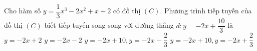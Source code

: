 \begin{ex}%
	Cho hàm số $y=\dfrac {1}{3} x^3-2x^2+x+2$ có đồ thị  $(C)$. Phương trình tiếp tuyến của đồ thị $(C)$ biết tiếp tuyến song song với đường thẳng
	 $d\colon y=-2x+\dfrac {10}{3}$ là
	\choice 
		{\True $y=-2x+2$} 
		 {$y=-2x-2$}
		{$y=-2x+10, y=-2x-\dfrac  {2}{3}$}
		{$y=-2x+10,  y=-2x+\dfrac {2}{3}$}
\end{ex}
